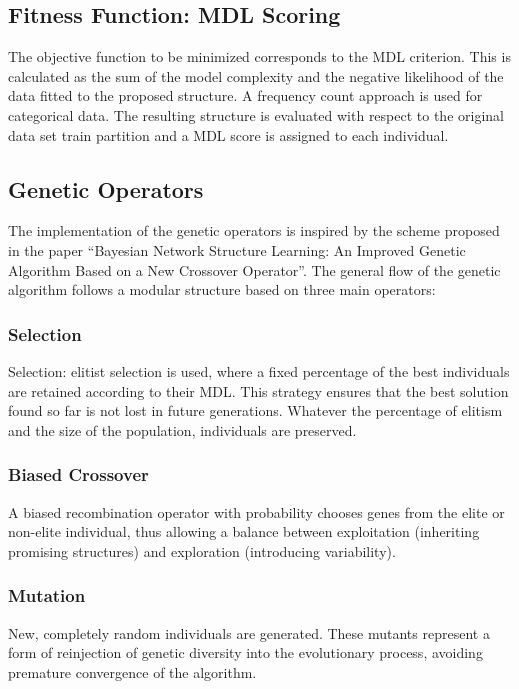 \documentclass[runningheads]{llncs}
\begin{document}
\subsection{Fitness Function: MDL Scoring}

The objective function to be minimized corresponds to the MDL criterion. This is calculated as the sum of the model complexity and the negative likelihood of the data fitted to the proposed structure. A frequency count approach is used for categorical data. The resulting structure is evaluated with respect to the original data set train partition and a MDL score is assigned to each individual.

\subsection{Genetic Operators}

The implementation of the genetic operators is inspired by the scheme proposed in the paper “Bayesian Network Structure Learning: An Improved Genetic Algorithm Based on a New Crossover Operator”. The general flow of the genetic algorithm follows a modular structure based on three main operators:

\subsubsection{Selection}

Selection: elitist selection is used, where a fixed percentage of the best individuals are retained according to their MDL. This strategy ensures that the best solution found so far is not lost in future generations. Whatever the percentage of elitism and the size of the population, individuals are preserved.

\subsubsection{Biased Crossover}

A biased recombination operator with probability chooses genes from the elite or non-elite individual, thus allowing a balance between exploitation (inheriting promising structures) and exploration (introducing variability).

\subsubsection{Mutation}

New, completely random individuals are generated. These mutants represent a form of reinjection of genetic diversity into the evolutionary process, avoiding premature convergence of the algorithm.
\end{document}
